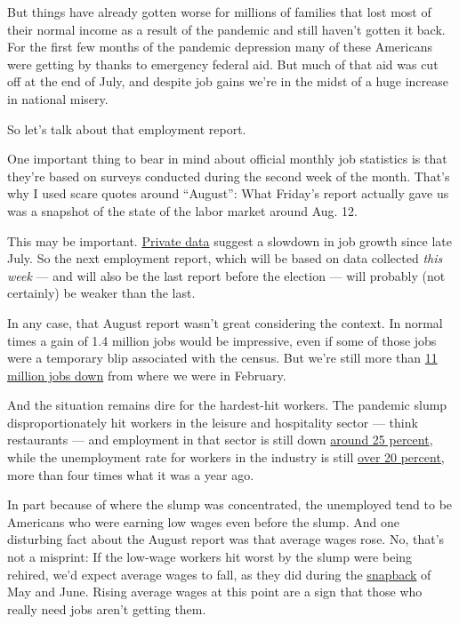 But things have already gotten worse for millions of families that lost
most of their normal income as a result of the pandemic and still
haven't gotten it back. For the first few months of the pandemic
depression many of these Americans were getting by thanks to emergency
federal aid. But much of that aid was cut off at the end of July, and
despite job gains we're in the midst of a huge increase in national
misery.

So let's talk about that employment report.

One important thing to bear in mind about official monthly job
statistics is that they're based on surveys conducted during the second
week of the month. That's why I used scare quotes around ``August'':
What Friday's report actually gave us was a snapshot of the state of the
labor market around Aug. 12.

This may be important.
\href{https://twitter.com/bencasselman/status/1301970073830199298}{Private
data} suggest a slowdown in job growth since late July. So the next
employment report, which will be based on data collected \emph{this
week} --- and will also be the last report before the election --- will
probably (not certainly) be weaker than the last.

In any case, that August report wasn't great considering the context. In
normal times a gain of 1.4 million jobs would be impressive, even if
some of those jobs were a temporary blip associated with the census. But
we're still more than
\href{https://fred.stlouisfed.org/series/PAYEMS}{11 million jobs down}
from where we were in February.

And the situation remains dire for the hardest-hit workers. The pandemic
slump disproportionately hit workers in the leisure and hospitality
sector --- think restaurants --- and employment in that sector is still
down
\href{https://twitter.com/ernietedeschi/status/1302305128863739906}{around
25 percent}, while the unemployment rate for workers in the industry is
still \href{https://www.bls.gov/news.release/pdf/empsit.pdf}{over 20
percent}, more than four times what it was a year ago.

In part because of where the slump was concentrated, the unemployed tend
to be Americans who were earning low wages even before the slump. And
one disturbing fact about the August report was that average wages rose.
No, that's not a misprint: If the low-wage workers hit worst by the
slump were being rehired, we'd expect average wages to fall, as they did
during the
\href{https://www.bls.gov/news.release/pdf/empsit.pdf}{snapback} of May
and June. Rising average wages at this point are a sign that those who
really need jobs aren't getting them.

